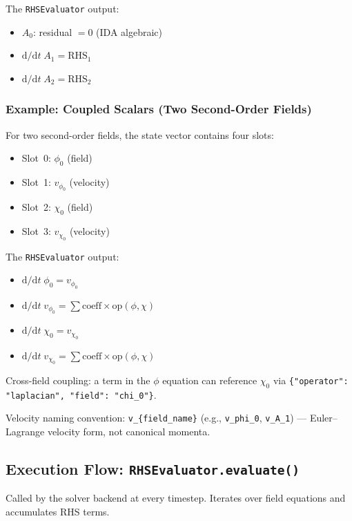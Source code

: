 The \texttt{RHSEvaluator} output:
\begin{itemize}
  \item $A_0$: residual $= 0$ (IDA algebraic)
  \item $\mathrm{d}/\mathrm{d}t\;A_1 = \text{RHS}_1$
  \item $\mathrm{d}/\mathrm{d}t\;A_2 = \text{RHS}_2$
\end{itemize}

\subsubsection{Example: Coupled Scalars (Two Second-Order Fields)}
\label{sec:state-example-coupled}

For two second-order fields, the state vector contains four slots:
\begin{itemize}
  \item Slot~0: $\phi_0$ (field)
  \item Slot~1: $v_{\phi_0}$ (velocity)
  \item Slot~2: $\chi_0$ (field)
  \item Slot~3: $v_{\chi_0}$ (velocity)
\end{itemize}

The \texttt{RHSEvaluator} output:
\begin{itemize}
  \item $\mathrm{d}/\mathrm{d}t\;\phi_0 = v_{\phi_0}$
  \item $\mathrm{d}/\mathrm{d}t\;v_{\phi_0} = \sum \text{coeff} \times \text{op}(\phi, \chi)$
  \item $\mathrm{d}/\mathrm{d}t\;\chi_0 = v_{\chi_0}$
  \item $\mathrm{d}/\mathrm{d}t\;v_{\chi_0} = \sum \text{coeff} \times \text{op}(\phi, \chi)$
\end{itemize}

Cross-field coupling: a term in the $\phi$ equation can reference $\chi_0$ via \texttt{\{"operator": "laplacian", "field": "chi\_0"\}}.

Velocity naming convention: \texttt{v\_\{field\_name\}} (e.g., \texttt{v\_phi\_0}, \texttt{v\_A\_1}) --- Euler--Lagrange velocity form, not canonical momenta.

\subsection{Execution Flow: \texttt{RHSEvaluator.evaluate()}}
\label{sec:rhs-evaluator}

Called by the solver backend at every timestep. Iterates over field equations and accumulates RHS terms.

